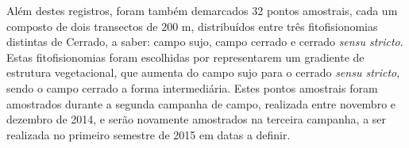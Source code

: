 Além destes registros, foram também demarcados 32 pontos amostrais, cada um composto de dois transectos de 200 m, distribuídos entre três fitofisionomias distintas de Cerrado, a saber: campo sujo, campo cerrado e cerrado \textit{sensu stricto}. Estas fitofisionomias foram escolhidas por representarem um gradiente de estrutura vegetacional, que aumenta do campo sujo para o cerrado \textit{sensu stricto}, sendo o campo cerrado a forma intermediária. Estes pontos amostrais foram amostrados durante a segunda campanha de campo, realizada entre novembro e dezembro de 2014, e serão novamente amostrados na terceira campanha, a ser realizada no primeiro semestre de 2015 em datas a definir.





